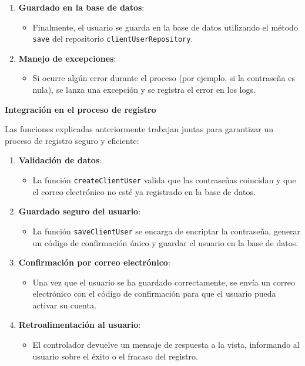 \documentclass[draft]{scrbook}
\begin{document}
\begin{enumerate}
\begin{enumerate}
    \item \textbf{Guardado en la base de datos}:
    \begin{itemize}
        \item Finalmente, el usuario se guarda en la base de datos utilizando el método \texttt{save} del repositorio \texttt{clientUserRepository}.
    \end{itemize}

    \item \textbf{Manejo de excepciones}:
    \begin{itemize}
        \item Si ocurre algún error durante el proceso (por ejemplo, si la contraseña es nula), se lanza una excepción y se registra el error en los logs.
    \end{itemize}
\end{enumerate}

\textbf{Integración en el proceso de registro}

Las funciones explicadas anteriormente trabajan juntas para garantizar un proceso de registro seguro y eficiente:

\begin{enumerate}
    \item \textbf{Validación de datos}:
    \begin{itemize}
        \item La función \texttt{createClientUser} valida que las contraseñas coincidan y que el correo electrónico no esté ya registrado en la base de datos.
    \end{itemize}

    \item \textbf{Guardado seguro del usuario}:
    \begin{itemize}
        \item La función \texttt{saveClientUser} se encarga de encriptar la contraseña, generar un código de confirmación único y guardar el usuario en la base de datos.
    \end{itemize}

    \item \textbf{Confirmación por correo electrónico}:
    \begin{itemize}
        \item Una vez que el usuario se ha guardado correctamente, se envía un correo electrónico con el código de confirmación para que el usuario pueda activar su cuenta.
    \end{itemize}

    \item \textbf{Retroalimentación al usuario}:
    \begin{itemize}
        \item El controlador devuelve un mensaje de respuesta a la vista, informando al usuario sobre el éxito o el fracaso del registro.
    \end{itemize}
\end{enumerate}


\end{enumerate}
\end{document}
